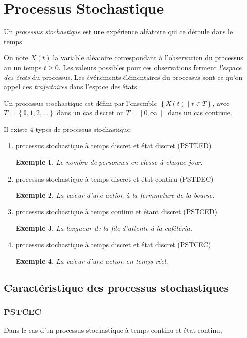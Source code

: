 \documentclass[11pt]{article}
\newtheorem*{exemple*}{Exemple}
\begin{document}
\section{Processus Stochastique}
\begin{definition}
	Un \textit{processus stochastique} est une expérience aléatoire qui ce
	déroule dans le temps.
\end{definition}

On note $X(t)$ la variable aléatoire correspondant à l'observation du processus
au un temps $t\geq 0$. Les valeurs possibles pour ces observations forment
\textit{l'espace des états} du processus. Les événements élémentaires du
processus sont ce qu'on appel des \textit{trajectoires} dans l'espace des
états.

Un processus stochastique est défini par l'ensemble $\left\{X(t)\middle\rvert
t\in T\right\}$, avec $T=\left\{0,1,2,\dots\right\}$ dans un cas discret ou
$T=\left[0,\infty\right[$ dans un cas continue.

Il existe 4 types de processus stochastique:
\begin{enumerate}
	\item processus stochastique à temps discret et état discret (PSTDED)
	\begin{exemple*}
		Le nombre de personnes en classe à chaque jour.
	\end{exemple*}
	\item processus stochastique à temps discret et état continu (PSTDEC)
	\begin{exemple*}
		La valeur d'une action à la fermmeture de la bourse.
	\end{exemple*}
	\item processus stochastique à temps continu et étant discret (PSTCED)
	\begin{exemple*}
		La longueur de la file d'attente à la cafétéria.
	\end{exemple*}
	\item processus stochastique à temps discret et état discret (PSTCEC)
	\begin{exemple*}
		La valeur d'une action en temps réel.
	\end{exemple*}
\end{enumerate}

\subsection{Caractéristique des processus stochastiques}
\subsubsection{PSTCEC}
Dans le cas d'un processus stochastique à temps continu et état continu, 
\end{document}
